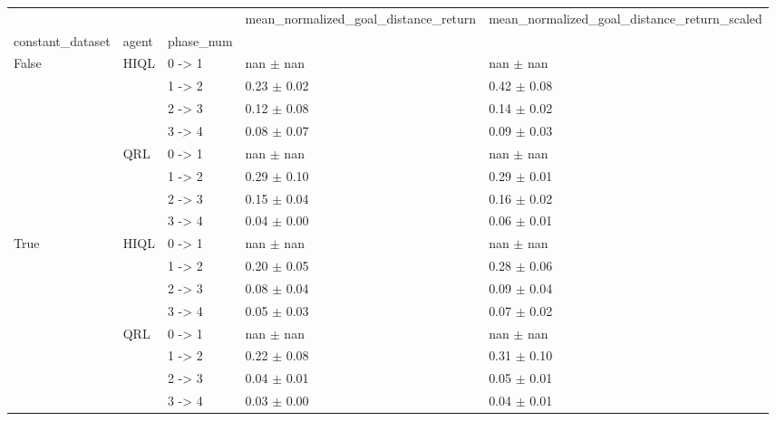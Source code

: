 \begin{tabular}{lllll}
\toprule
 &  &  & mean_normalized_goal_distance_return & mean_normalized_goal_distance_return_scaled \\
constant_dataset & agent & phase_num &  &  \\
\midrule
\multirow[t]{8}{*}{False} & \multirow[t]{4}{*}{HIQL} & 0 -> 1 & nan $\pm$ nan & nan $\pm$ nan \\
 &  & 1 -> 2 & 0.23 $\pm$ 0.02 & 0.42 $\pm$ 0.08 \\
 &  & 2 -> 3 & 0.12 $\pm$ 0.08 & 0.14 $\pm$ 0.02 \\
 &  & 3 -> 4 & 0.08 $\pm$ 0.07 & 0.09 $\pm$ 0.03 \\
\cline{2-5}
 & \multirow[t]{4}{*}{QRL} & 0 -> 1 & nan $\pm$ nan & nan $\pm$ nan \\
 &  & 1 -> 2 & 0.29 $\pm$ 0.10 & 0.29 $\pm$ 0.01 \\
 &  & 2 -> 3 & 0.15 $\pm$ 0.04 & 0.16 $\pm$ 0.02 \\
 &  & 3 -> 4 & 0.04 $\pm$ 0.00 & 0.06 $\pm$ 0.01 \\
\cline{1-5} \cline{2-5}
\multirow[t]{8}{*}{True} & \multirow[t]{4}{*}{HIQL} & 0 -> 1 & nan $\pm$ nan & nan $\pm$ nan \\
 &  & 1 -> 2 & 0.20 $\pm$ 0.05 & 0.28 $\pm$ 0.06 \\
 &  & 2 -> 3 & 0.08 $\pm$ 0.04 & 0.09 $\pm$ 0.04 \\
 &  & 3 -> 4 & 0.05 $\pm$ 0.03 & 0.07 $\pm$ 0.02 \\
\cline{2-5}
 & \multirow[t]{4}{*}{QRL} & 0 -> 1 & nan $\pm$ nan & nan $\pm$ nan \\
 &  & 1 -> 2 & 0.22 $\pm$ 0.08 & 0.31 $\pm$ 0.10 \\
 &  & 2 -> 3 & 0.04 $\pm$ 0.01 & 0.05 $\pm$ 0.01 \\
 &  & 3 -> 4 & 0.03 $\pm$ 0.00 & 0.04 $\pm$ 0.01 \\
\cline{1-5} \cline{2-5}
\bottomrule
\end{tabular}
